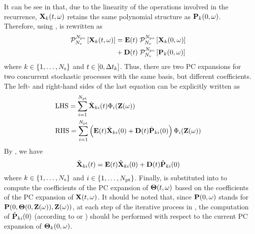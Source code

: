 It can be see in  that, due to the linearity of the operations involved in the recurrence, $\mathbf{X}_k(t, \omega)$ retains the same polynomial structure as $\mathbf{P}_k(0, \omega)$. Therefore, using ,  is rewritten as
\begin{align*}
  \oPC{\vars}{\pcorder}{\vX_k(\t, \o)} & = \mE(\t) \; \oPC{\vars}{\pcorder}{\vX_k(0, \o)} \\
  & {} + \mD(\t) \; \oPC{\vars}{\pcorder}{\vP_k(0, \o)}
\end{align*}
where $k \in \{ 1, \dotsc, N_\text{s} \}$ and $t \in [0, \Delta t_k]$. Thus, there are two PC expansions for two concurrent stochastic processes with the same basis, but different coefficients. The left- and right-hand sides of the last equation can be explicitly written as
\begin{align*}
  & \text{LHS} = \sum_{i = 1}^{\pcterms} \pcc{\vX}_{ki}(\t) \pcb_i(\vZ(\o)) \\
  & \text{RHS} = \sum_{i = 1}^{\pcterms} \left( \mE(\t) \pcc{\vX}_{ki}(0) + \mD(\t) \pcc{\vP}_{ki}(0) \right) \pcb_i(\vZ(\o))
\end{align*}
By , we have
\begin{equation} \elabel{pc-recurrence}
  \pcc{\vX}_{ki}(\t) = \mE(\t) \pcc{\vX}_{ki}(0) + \mD(\t) \pcc{\vP}_{ki}(0)
\end{equation}
where $k \in \{ 1, \dots, N_\text{s} \}$ and $i \in \{ 1, \dotsc, {N_\text{pt}} \}$. Finally,  is substituted into  to compute the coefficients of the PC expansion of ${\boldsymbol\Theta}(t, \omega)$ based on the coefficients of the PC expansion of $\mathbf{X}(t, \omega)$. It should be noted that, since $\mathbf{P}(0, \omega)$ stands for $\mathbf{P}(0, {\boldsymbol\Theta}(0, \mathbf{Z}(\omega)), \mathbf{Z}(\omega))$, at each step of the iterative process in , the computation of $\hat{\mathbf{P}}_{ki}(0)$ (according to  or ) should be performed with respect to the current PC expansion of ${\boldsymbol\Theta}_k(0, \omega)$.
